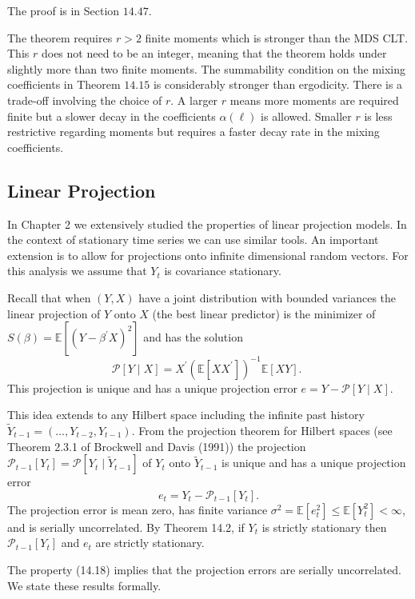 \documentclass[10pt]{article}
\begin{document}
The proof is in Section $14.47$.

The theorem requires $r>2$ finite moments which is stronger than the MDS CLT. This $r$ does not need to be an integer, meaning that the theorem holds under slightly more than two finite moments. The summability condition on the mixing coefficients in Theorem $14.15$ is considerably stronger than ergodicity. There is a trade-off involving the choice of $r$. A larger $r$ means more moments are required finite but a slower decay in the coefficients $\alpha(\ell)$ is allowed. Smaller $r$ is less restrictive regarding moments but requires a faster decay rate in the mixing coefficients.

\subsection{Linear Projection}
In Chapter 2 we extensively studied the properties of linear projection models. In the context of stationary time series we can use similar tools. An important extension is to allow for projections onto infinite dimensional random vectors. For this analysis we assume that $Y_{t}$ is covariance stationary.

Recall that when $(Y, X)$ have a joint distribution with bounded variances the linear projection of $Y$ onto $X$ (the best linear predictor) is the minimizer of $S(\beta)=\mathbb{E}\left[\left(Y-\beta^{\prime} X\right)^{2}\right]$ and has the solution
$$
\mathscr{P}[Y \mid X]=X^{\prime}\left(\mathbb{E}\left[X X^{\prime}\right]\right)^{-1} \mathbb{E}[X Y] \text {. }
$$
This projection is unique and has a unique projection error $e=Y-\mathscr{P}[Y \mid X]$.

This idea extends to any Hilbert space including the infinite past history $\widetilde{Y}_{t-1}=\left(\ldots, Y_{t-2}, Y_{t-1}\right)$. From the projection theorem for Hilbert spaces (see Theorem 2.3.1 of Brockwell and Davis (1991)) the projection $\mathscr{P}_{t-1}\left[Y_{t}\right]=\mathscr{P}\left[Y_{t} \mid \tilde{Y}_{t-1}\right]$ of $Y_{t}$ onto $\widetilde{Y}_{t-1}$ is unique and has a unique projection error
$$
e_{t}=Y_{t}-\mathscr{P}_{t-1}\left[Y_{t}\right] .
$$
The projection error is mean zero, has finite variance $\sigma^{2}=\mathbb{E}\left[e_{t}^{2}\right] \leq \mathbb{E}\left[Y_{t}^{2}\right]<\infty$, and is serially uncorrelated. By Theorem 14.2, if $Y_{t}$ is strictly stationary then $\mathscr{P}_{t-1}\left[Y_{t}\right]$ and $e_{t}$ are strictly stationary.

The property (14.18) implies that the projection errors are serially uncorrelated. We state these results formally.
\end{document}
